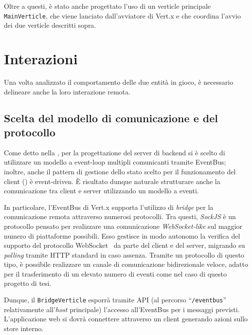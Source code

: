      Oltre a questi, è stato anche progettato l'uso di un verticle principale \texttt{MainVerticle}, che viene lanciato dall'avviatore di Vert.x e che coordina l'avvio dei due verticle descritti sopra.

    

  \section{Interazioni}\label{sec:arch:interaction}

    Una volta analizzato il comportamento delle due entità in gioco, è necessario delineare anche la loro interazione remota.

    \subsection{Scelta del modello di comunicazione e del protocollo}

      Come detto nella , per la progettazione del server di backend si è scelto di utilizzare un modello a event-loop multipli comunicanti tramite EventBus;
      inoltre, anche il pattern di gestione dello stato scelto per il funzionamento del client () è event-driven.
      È risultato dunque naturale strutturare anche la comunicazione tra client e server utilizzando un modello a eventi.

      In particolare, l'EventBus di Vert.x supporta l'utilizzo di \emph{bridge} per la comunicazione remota attraverso numerosi protocolli.
      Tra questi, \emph{SockJS} è un protocollo pensato per realizzare una comunicazione \emph{WebSocket-like} sul maggior numero di piattaforme possibili.
      Esso gestisce in modo autonomo la verifica del supporto del protocollo WebSocket~\cite{Melnikov2011} da parte del client e del server, migrando su \emph{polling} tramite HTTP standard in caso assenza.
      Tramite un protocollo di questo tipo, è possibile realizzare un canale di comunicazione bidirezionale veloce, adatto per il trasferimento di un elevato numero di eventi come nel caso di questo progetto di tesi.

      Dunque, il \texttt{BridgeVerticle} esporrà tramite API (al percorso ``\texttt{/eventbus}'' relativamente all'\emph{host} principale) l'accesso all'EventBus per i messaggi previsti.
      L'applicazione web si dovrà connettere attraverso un client generando azioni sullo store interno.

